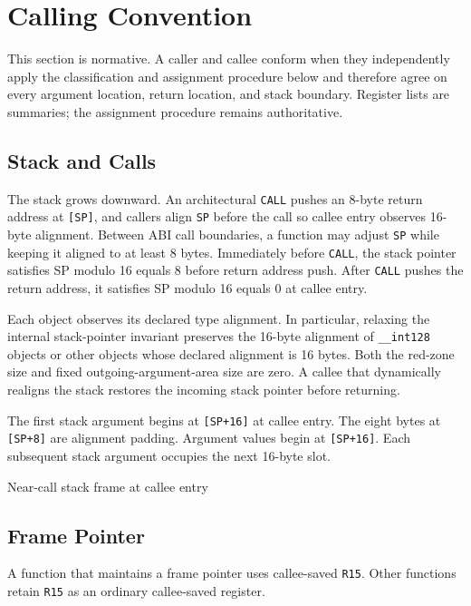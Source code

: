 \documentclass[10pt,twoside]{article}
\begin{document}
\section{Calling Convention}\label{page:calling-convention}
This section is normative. A caller and callee conform when they independently
apply the classification and assignment procedure below and therefore agree on
every argument location, return location, and stack boundary. Register lists
are summaries; the assignment procedure remains authoritative.

\subsection{Stack and Calls}
The stack grows downward. An architectural \texttt{CALL} pushes an
8-byte return address at \texttt{[SP]}, and
callers align \texttt{SP} before the call so callee entry observes
16-byte alignment. Between ABI call boundaries, a function
may adjust \texttt{SP} while keeping it aligned to at least
8 bytes. Immediately before \texttt{CALL}, the stack
pointer satisfies SP modulo 16 equals 8 before return address push. After \texttt{CALL} pushes the
return address, it satisfies SP modulo 16 equals 0 at callee entry.

Each object observes its declared type alignment. In particular, relaxing
the internal stack-pointer invariant preserves the 16-byte alignment of
\texttt{\_\_int128} objects or other objects whose declared alignment is 16
bytes. Both the red-zone size and fixed outgoing-argument-area size are zero. A
callee that dynamically realigns the stack restores the incoming stack
pointer before returning.

The first stack argument begins at \texttt{[SP+16]} at callee entry. The eight
bytes at \texttt{[SP+8]} are alignment padding. Argument values begin at
\texttt{[SP+16]}.
Each subsequent stack argument occupies the next 16-byte slot.

\begin{BedrockListedStackFrameDiagram}{Near-call stack frame at callee entry}
\end{BedrockListedStackFrameDiagram}

\subsection{Frame Pointer}
A function that maintains a frame pointer uses callee-saved \texttt{R15}.
Other functions retain \texttt{R15} as an ordinary callee-saved register.
\end{document}
